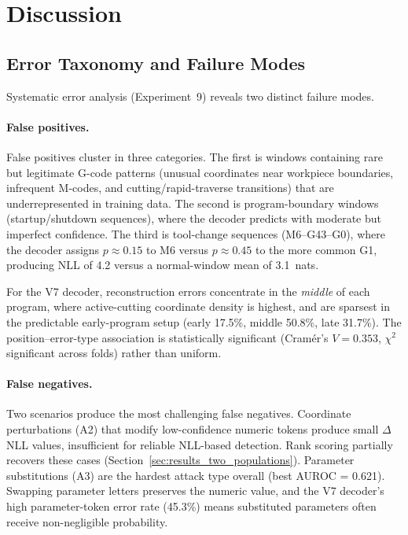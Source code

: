 \section{Discussion}
\label{sec:discussion}

\subsection{Error Taxonomy and Failure Modes}
\label{sec:disc_errors}

Systematic error analysis (Experiment~9) reveals two distinct failure modes.

\paragraph{False positives.}
False positives cluster in three categories.
The first is windows containing rare but legitimate G-code patterns (unusual coordinates near workpiece boundaries, infrequent M-codes, and cutting/rapid-traverse transitions) that are underrepresented in training data.
The second is program-boundary windows (startup/shutdown sequences), where the decoder predicts with moderate but imperfect confidence.
The third is tool-change sequences (M6--G43--G0), where the decoder assigns $p \approx 0.15$ to M6 versus $p \approx 0.45$ to the more common G1, producing NLL of 4.2 versus a normal-window mean of 3.1~nats.

For the V7 decoder, reconstruction errors concentrate in the \emph{middle} of each program, where active-cutting coordinate density is highest, and are sparsest in the predictable early-program setup (early 17.5\%, middle 50.8\%, late 31.7\%).
The position--error-type association is statistically significant (Cram\'er's $V = 0.353$, $\chi^2$ significant across folds) rather than uniform.

\paragraph{False negatives.}
Two scenarios produce the most challenging false negatives.
Coordinate perturbations (A2) that modify low-confidence numeric tokens produce small $\Delta$NLL values, insufficient for reliable NLL-based detection.
Rank scoring partially recovers these cases (Section~\ref{sec:results_two_populations}).
Parameter substitutions (A3) are the hardest attack type overall (best AUROC = 0.621).
Swapping parameter letters preserves the numeric value, and the V7 decoder's high parameter-token error rate (45.3\%) means substituted parameters often receive non-negligible probability.

